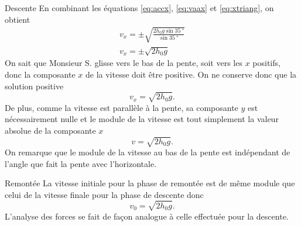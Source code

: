 \documentclass{tufte-handout}
\begin{document}
{\begin{subsection}{Descente}
    En combinant les équations \ref{eq:accx}, \ref{eq:vaax} et
    \ref{eq:xtriang}, on obtient
    \begin{align*}
      v_x = \pm\sqrt{\frac{2h_0g\sin\SI{35}{\degree}}{\sin\SI{35}{\degree}}} \\
      v_x = \pm \sqrt{2h_0g}
    \end{align*}
    On sait que Monsieur S. glisse vers le bas de la pente, soit vers les $x$
    positifs, donc la composante $x$ de la vitesse doit être positive. On ne
    conserve donc que la solution positive
    \begin{equation*}
      v_x = \sqrt{2h_0g}.
    \end{equation*}
    De plus, comme la vitesse est parallèle à la pente, sa composante $y$ est
    nécessairement nulle et le module de la vitesse est tout simplement la
    valeur absolue de la composante $x$
    \begin{equation}
    \label{eq:vfdescente}
      v = \sqrt{2h_0g}.
    \end{equation}
    On remarque que le module de la vitesse au bas de la pente est indépendant
    de l'angle que fait la pente avec l'horizontale.
  \end{subsection}



  \begin{subsection}{Remontée}
    La vitesse initiale pour la phase de remontée est de même module que celui
    de la vitesse finale pour la phase de descente donc
    \begin{equation*}
      v_0 = \sqrt{2h_0g}.
    \end{equation*}
    L'analyse des forces se fait de façon analogue à celle effectuée pour la
    descente.

    \begin{marginfigure}
    \end{marginfigure}


\end{subsection}}
\end{document}
